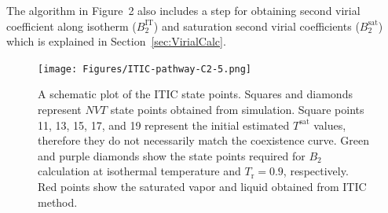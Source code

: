 \documentclass[5p,times]{elsarticle}
\begin{document}
The algorithm in Figure~2 also includes a step for obtaining second virial coefficient along isotherm ($B_2^\mathrm{IT}$) and saturation second virial coefficients ($B_2^\mathrm{sat}$) which is explained in Section~\ref{sec:VirialCalc}.
\begin{figure}
\texttt{[image: Figures/ITIC-pathway-C2-5.png]}
\caption{A schematic plot of the ITIC state points. Squares and diamonds represent $NVT$ state points obtained from simulation. Square points 11, 13, 15, 17, and 19 represent the initial estimated $T^\mathrm{sat}$ values, therefore they do not necessarily match the coexistence curve. Green and purple diamonds show the state points required for $B_2$ calculation at isothermal temperature and $T_\mathrm{r}=0.9$, respectively. Red points show the saturated vapor and liquid obtained from ITIC method.}
\label{fig:ITICpathway}
\end{figure}
\end{document}
